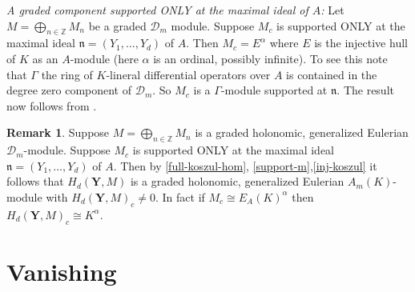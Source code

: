 \documentclass{amsart}
\newcommand{\ZZ}{\mathbb{Z} }
\newcommand{\D}{\mathcal{D} }
\newcommand{\bY}{\mathbf{Y} }
\newcommand{\n}{\mathfrak{n} }
\theoremstyle{plain}
\theoremstyle{definition}
\newtheorem{remark}[theorem]{Remark}
\theoremstyle{remark}
\begin{document}
\s \label{support-m}\textit{ A graded component supported ONLY at the maximal ideal of $A$:}  Let $M = \bigoplus_{n \in \ZZ}M_n$ be a graded $\D_m$ module.
Suppose $M_c$ is supported ONLY at the maximal ideal $\n = (Y_1, \ldots, Y_d)$ of $A$. Then 
$M_c = E^{\alpha}$ where $E$ is the injective hull of
$K$ as an $A$-module (here $\alpha$ is an ordinal, possibly infinite). To see this note that $\Gamma$ the ring of $K$-lineral differential operators over $A$ is
contained in the degree zero component of $\D_m$. So $M_c$ is a $\Gamma$-module supported at $\n$. The result now follows from
\cite[2.4(a)]{Lyu-1}.


\begin{remark} \label{key-remark}
 Suppose $M = \bigoplus_{n \in \ZZ}M_n$ is a graded holonomic, generalized Eulerian  $\D_m$-module. Suppose $M_c$ is supported ONLY at the maximal
 ideal $\n = (Y_1, \ldots, Y_d)$ of $A$. Then by \ref{full-koszul-hom},  \ref{support-m},\ref{inj-koszul} it follows that
 $H_d(\bY, M)$ is a graded holonomic, generalized Eulerian $A_m(K)$-module with $H_d(\bY, M)_c \neq 0$.
 In fact if $M_c \cong E_A(K)^\alpha$ then $H_d(\bY, M)_c \cong K^\alpha$.
\end{remark}

 \section{Vanishing}
\end{document}
